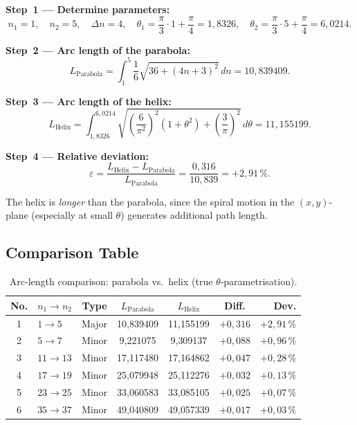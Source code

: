 \textbf{Step~1 --- Determine parameters:}
\[
n_1 = 1,\quad n_2 = 5,\quad \Delta n = 4,\quad
\theta_1 = \frac{\pi}{3}\cdot 1 + \frac{\pi}{4} = 1{,}8326,\quad
\theta_2 = \frac{\pi}{3}\cdot 5 + \frac{\pi}{4} = 6{,}0214.
\]

\textbf{Step~2 --- Arc length of the parabola:}
\[
L_{\text{Parabola}}
= \int_{1}^{5} \frac{1}{6}\sqrt{36 + (4n+3)^2}\, dn
= \boxed{10{,}839409}.
\]

\textbf{Step~3 --- Arc length of the helix:}
\[
L_{\text{Helix}}
= \int_{1{,}8326}^{6{,}0214}
  \sqrt{\left(\frac{6}{\pi^2}\right)^2(1 + \theta^2)
  + \left(\frac{3}{\pi}\right)^2}\, d\theta
= \boxed{11{,}155199}.
\]

\textbf{Step~4 --- Relative deviation:}
\[
\varepsilon = \frac{L_{\text{Helix}} - L_{\text{Parabola}}}{L_{\text{Parabola}}}
= \frac{0{,}316}{10{,}839} = \boxed{+2{,}91\,\%}.
\]

\begin{remark}\label{rem:helix-longer}
The helix is \emph{longer} than the parabola, since the spiral motion in
the $(x,y)$-plane (especially at small $\theta$) generates additional
path length.
\end{remark}

\subsection{Comparison Table}

\begin{table}[H]
\centering
\caption{Arc-length comparison: parabola vs.\ helix
  (true $\theta$-parametrisation).}
\label{tab:arc-length-comparison}
\begin{tabular}{clccccr}
\toprule
No. & $n_1 \to n_2$ & Type
  & $L_{\text{Parabola}}$ & $L_{\text{Helix}}$
  & Diff. & Dev. \\
\midrule
1 & $1 \to 5$   & Major
  & 10{,}839409 & 11{,}155199 & $+0{,}316$ & $+2{,}91\,\%$ \\
2 & $5 \to 7$   & Minor
  & 9{,}221075  & 9{,}309137  & $+0{,}088$ & $+0{,}96\,\%$ \\
3 & $11 \to 13$ & Minor
  & 17{,}117480 & 17{,}164862 & $+0{,}047$ & $+0{,}28\,\%$ \\
4 & $17 \to 19$ & Minor
  & 25{,}079948 & 25{,}112276 & $+0{,}032$ & $+0{,}13\,\%$ \\
5 & $23 \to 25$ & Minor
  & 33{,}060583 & 33{,}085105 & $+0{,}025$ & $+0{,}07\,\%$ \\
6 & $35 \to 37$ & Minor
  & 49{,}040809 & 49{,}057339 & $+0{,}017$ & $+0{,}03\,\%$ \\
\bottomrule
\end{tabular}
\end{table}

